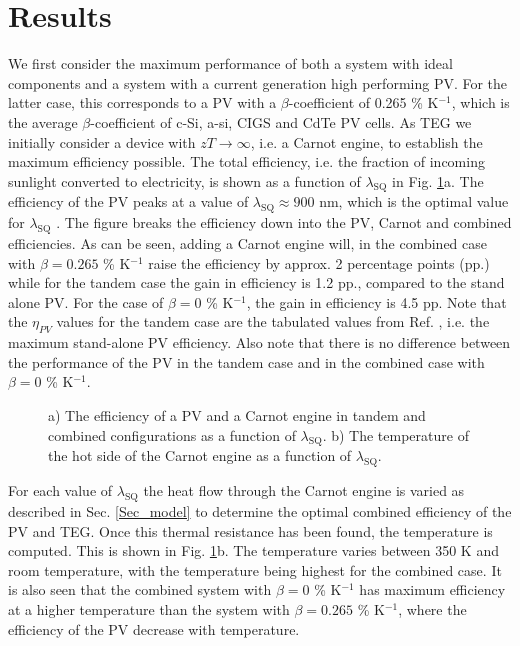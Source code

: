 \documentclass[fleqn,10pt]{SelfArx} %
\newcommand{\n}[1]{\mathrm{#1}}
\begin{document}
\section{Results}
We first consider the maximum performance of both a system with ideal components and a system with a current generation high performing PV. For the latter case, this corresponds to a PV with a $\beta$-coefficient of 0.265 \% K$^{-1}$, which is the average $\beta$-coefficient of c-Si, a-si, CIGS and CdTe PV cells. As TEG we initially consider a device with $zT\rightarrow\infty$, i.e. a Carnot engine, to establish the maximum efficiency possible. The total efficiency, i.e. the fraction of incoming sunlight converted to electricity, is shown as a function of $\lambda_\n{SQ}$ in Fig. \ref{Fig_Eff_SQ_plot}a. The efficiency of the PV peaks at a value of $\lambda_\n{SQ}\approx 900$ nm, which is the optimal value for $\lambda_\n{SQ}$ \cite{Ruhle_2016}. The figure breaks the efficiency down into the PV, Carnot and combined efficiencies. As can be seen, adding a Carnot engine will, in the combined case with $\beta=0.265$ \% K$^{-1}$ raise the efficiency by approx. 2 percentage points (pp.) while for the tandem case the gain in efficiency is 1.2 pp., compared to the stand alone PV. For the case of $\beta=0$ \% K$^{-1}$, the gain in efficiency is 4.5 pp. Note that the $\eta_{PV}$ values for the tandem case are the tabulated values from Ref. \cite{Ruhle_2016}, i.e. the maximum stand-alone PV efficiency. Also note that there is no difference between the performance of the PV in the tandem case and in the combined case with $\beta=0$ \% K$^{-1}$.

\begin{figure}[!t]
\caption{a) The efficiency of a PV and a Carnot engine in tandem and combined configurations as a function of $\lambda_\n{SQ}$. b) The temperature of the hot side of the Carnot engine as a function of $\lambda_\n{SQ}$.}\label{Fig_Eff_SQ_plot}
\end{figure}

For each value of $\lambda_\n{SQ}$ the heat flow through the Carnot engine is varied as described in Sec. \ref{Sec_model} to determine the optimal combined efficiency of the PV and TEG. Once this thermal resistance has been found, the temperature is computed. This is shown in Fig. \ref{Fig_Eff_SQ_plot}b. The temperature varies between 350 K and room temperature, with the temperature being highest for the combined case. It is also seen that the combined system with $\beta=0$ \% K$^{-1}$ has maximum efficiency at a higher temperature than the system with $\beta=0.265$ \% K$^{-1}$, where the efficiency of the PV decrease with temperature.
\end{document}
